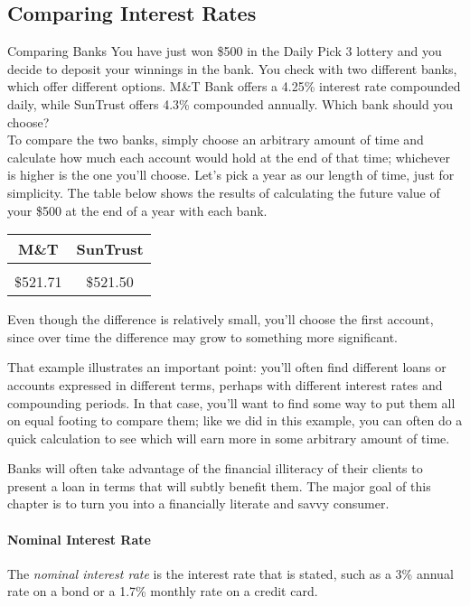 \subsection{Comparing Interest Rates}
\begin{example}[https://www.youtube.com/watch?v=8xqmxdrDOcQ]{Comparing Banks}
You have just won \$500 in the Daily Pick 3 lottery and you decide to deposit your winnings in the bank.  You check with two different banks, which offer different options.  M\&T Bank offers a 4.25\% interest rate compounded daily, while SunTrust offers 4.3\% compounded annually.  Which bank should you choose?\\

To compare the two banks, simply choose an arbitrary amount of time and calculate how much each account would hold at the end of that time; whichever is higher is the one you'll choose.  Let's pick a year as our length of time, just for simplicity.  The table below shows the results of calculating the future value of your \$500 at the end of a year with each bank.
\begin{center}
\begin{tabular}{c c}
M\&T & SunTrust\\
\hline
& \\
\$521.71 & \$521.50
\end{tabular}
\end{center}
Even though the difference is relatively small, you'll choose the first account, since over time the difference may grow to something more significant.
\end{example}

That example illustrates an important point: you'll often find different loans or accounts expressed in different terms, perhaps with different interest rates and compounding periods.  In that case, you'll want to find some way to put them all on equal footing to compare them; like we did in this example, you can often do a quick calculation to see which will earn more in some arbitrary amount of time.

Banks will often take advantage of the financial illiteracy of their clients to present a loan in terms that will subtly benefit them.  The major goal of this chapter is to turn you into a financially literate and savvy consumer.
\vfill
\pagebreak

\paragraph{Nominal Interest Rate} The \textit{nominal interest rate} is the interest rate that is stated, such as a 3\% annual rate on a bond or a 1.7\% monthly rate on a credit card.

